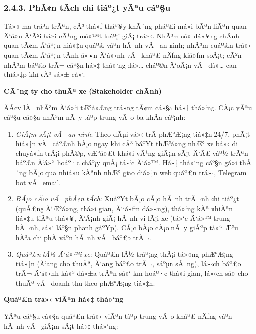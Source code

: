 \documentclass[a4paper]{extarticle}
\providecommand{\tightlist}{%
  \setlength{\itemsep}{0pt}\setlength{\parskip}{0pt}}
\begin{document}
\subsubsection{2.4.3. PhÃ¢n tÃ­ch chi tiáº¿t yÃªu
cáº§u}\label{243-phuxe2n-tuxedch-chi-tiux1ebft-yuxeau-cux1ea7u}

Tá»« ma tráº­n trÃªn, cÃ³ thá»ƒ tháº¥y khÃ´ng pháº£i má»i bÃªn liÃªn quan Ä‘á»u Ä‘Ã²i há»i cÃ¹ng
má»™t loáº¡i giÃ¡ trá»‹. NhÃ³m sá»­ dá»¥ng chÃ­nh quan tÃ¢m Ä‘áº¿n hiá»‡u quáº£ váº­n hÃ nh vÃ  an
ninh; nhÃ³m quáº£n trá»‹ quan tÃ¢m Ä‘áº¿n tÃ­nh á»•n Ä‘á»‹nh vÃ  kháº£ nÄƒng kiá»ƒm soÃ¡t; cÃ²n
nhÃ³m báº£o trÃ¬ cáº§n há»‡ thá»‘ng dá»… cháº©n Ä‘oÃ¡n vÃ  dá»… can thiá»‡p khi cÃ³ sá»± cá»‘.

\textbf{CÃ´ng ty cho thuÃª xe (Stakeholder chÃ­nh)}

ÄÃ¢y lÃ  nhÃ³m Ä‘á»‘i tÆ°á»£ng trá»ng tÃ¢m cá»§a há»‡ thá»‘ng. CÃ¡c yÃªu cáº§u cá»§a nhÃ³m nÃ y
táº­p trung vÃ o ba khÃ­a cáº¡nh:

\begin{enumerate}
\def\labelenumi{\arabic{enumi}.}
\tightlist
\item
  \emph{GiÃ¡m sÃ¡t vÃ  an ninh}: Theo dÃµi vá»‹ trÃ­ phÆ°Æ¡ng tiá»‡n 24/7, phÃ¡t
  hiá»‡n vÃ  cáº£nh bÃ¡o ngay khi cÃ³ báº¥t thÆ°á»ng nhÆ° xe bá»‹ di chuyá»ƒn trÃ¡i phÃ©p,
  vÆ°á»£t khá»i vÃ¹ng giÃ¡m sÃ¡t Ä‘Ã£ váº½ trÃªn báº£n Ä‘á»“ hoáº·c cháº¡y quÃ¡ tá»‘c Ä‘á»™. Há»‡
  thá»‘ng cáº§n gá»­i thÃ´ng bÃ¡o qua nhiá»u kÃªnh nhÆ° giao diá»‡n web quáº£n trá»‹,
  Telegram bot vÃ  email.
\item
  \emph{BÃ¡o cÃ¡o vÃ  phÃ¢n tÃ­ch}: Xuáº¥t bÃ¡o cÃ¡o hÃ nh trÃ¬nh chi tiáº¿t (quÃ£ng
  Ä‘Æ°á»ng, thá»i gian, Ä‘iá»ƒm dá»«ng), thá»‘ng kÃª nhiÃªn liá»‡u tiÃªu thá»¥, Ä‘Ã¡nh giÃ¡
  hÃ nh vi lÃ¡i xe (tá»‘c Ä‘á»™ trung bÃ¬nh, sá»‘ láº§n phanh gáº¥p). CÃ¡c bÃ¡o cÃ¡o nÃ y
  giÃºp tá»‘i Æ°u hÃ³a chi phÃ­ váº­n hÃ nh vÃ  báº£o trÃ¬.
\item
  \emph{Quáº£n lÃ½ Ä‘á»™i xe}: Quáº£n lÃ½ tráº¡ng thÃ¡i tá»«ng phÆ°Æ¡ng tiá»‡n (Ä‘ang cho
  thuÃª, Ä‘ang báº£o trÃ¬, sáºµn sÃ ng), lá»‹ch báº£o trÃ¬ Ä‘á»‹nh ká»³ dá»±a trÃªn sá»‘ km
  hoáº·c thá»i gian, lá»‹ch sá»­ cho thuÃª vÃ  doanh thu theo phÆ°Æ¡ng tiá»‡n.
\end{enumerate}

\textbf{Quáº£n trá»‹ viÃªn há»‡ thá»‘ng}

YÃªu cáº§u cá»§a quáº£n trá»‹ viÃªn táº­p trung vÃ o kháº£ nÄƒng váº­n hÃ nh vÃ  giÃ¡m sÃ¡t há»‡
thá»‘ng:
\end{document}
